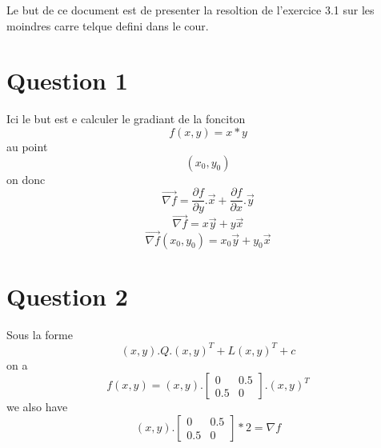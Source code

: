 \documentclass{article}
\begin{document}
  Le but de ce document est de presenter la resoltion de l'exercice 3.1 sur les moindres carre telque defini dans le cour.
  \section{Question 1}
  Ici le but est e calculer le gradiant de la fonciton \[ f(x, y) = x*y\] au point \[(x_0, y_0)\]
  on donc 
  $$ \vec{\nabla f} =  \frac{\partial f}{\partial y}.\vec{x} + \frac{\partial f}{\partial x}.\vec{y}$$
  $$ \vec{\nabla f} = x\vec{y} + y\vec{x} $$
  $$ \vec{\nabla f} (x_0, y_0) = x_0\vec{y} + y_0\vec{x} $$
  \section{Question 2}
  Sous la forme 
  $$(x, y).Q.(x, y)^T + L(x, y)^T + c$$
  on a 
  $$f(x, y) = (x, y).\begin{bmatrix}0 & 0.5 \\  0.5& 0\end{bmatrix}.(x, y)^T $$
  we also have 
  $$ (x, y).\begin{bmatrix}0 & 0.5 \\  0.5& 0\end{bmatrix} * 2 = \nabla f$$
\end{document}
